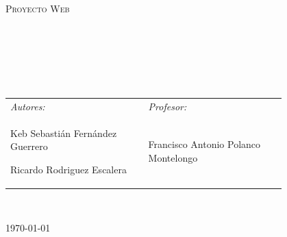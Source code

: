\begin{center}
	\begin{minipage}{0.9\textwidth}
		\begin{center}
			\textsc{\LARGE Proyecto Web}
		\end{center}
	\end{minipage}\\[0.5cm]


	\vspace*{1cm}

	\HRule \\[0.4cm]
	{ \huge \bfseries \docTitulo}\\[0.4cm]

	\HRule \\[1.5cm]

	\begin{table}[H]
		\centering
		\begin{tabular}{L{0.4\linewidth} R{0.4\linewidth}}
			\emph{Autores:} & \emph{Profesor:} \\

			{%
			Keb Sebastián Fernández Guerrero

			Ricardo Rodriguez Escalera 
			}               & {                %
					Francisco Antonio Polanco Montelongo
			}                                  \\
		\end{tabular}
	\end{table}
	\vspace{1cm}

	\\
	\vspace{2cm}
	\begin{center}
		{\large \today}
	\end{center}
\end{center}

\newpage
